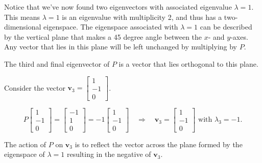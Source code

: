 \documentclass[12pt]{article}
\newcommand{\nin}{\noindent}
\newcommand{\vthree}{\vspace{3mm}}
\newcommand{\mymat}[1]{
\left[
\begin{array}{rrrrrrrrrrrrrrrrrrrrrrrrrrrrrrrrrrrrrrr}
#1
\end{array}
\right]
}
\newcommand{\bv}{\mathbf{v}}
\begin{document}
\vthree

\nin Notice that we've now found two eigenvectors with associated eigenvalue $\lambda = 1$.  This means $\lambda = 1$ is an eigenvalue with multiplicity 2, and thus has a two-dimensional eigenspace.   The eigenspace associated with $\lambda = 1$ can be described by the vertical plane that makes a 45 degree angle between the $x$- and $y$-axes.  Any vector that lies in this plane will be left unchanged by multiplying by $P$.


\begin{center}
\end{center}

\clearpage

\nin The third and final eigenvector of $P$ is a vector that lies orthogonal to this plane.

\vthree

\nin Consider the vector $\bv_3 = \mymat{1 \\ -1 \\ 0}$.

\vthree

\[
P\mymat{1 \\ -1 \\ 0} = \mymat{-1 \\ 1 \\ 0} = -1 \mymat{1 \\ -1 \\ 0} \quad \Rightarrow \quad \bv_3 = \mymat{1 \\ -1 \\ 0} \textrm{ with } \lambda_3 = -1.
\]

\vthree

\nin The action of $P$ on $\bv_3$ is to reflect the vector across the plane formed by the eigenspace of $\lambda = 1$ resulting in the negative of $\bv_3$.
\end{document}
